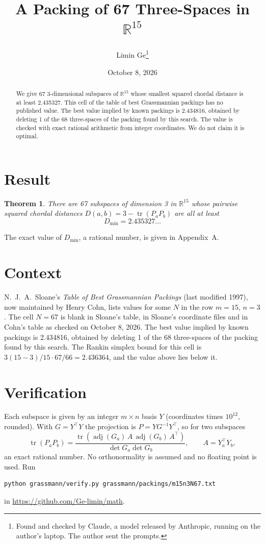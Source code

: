 \documentclass[11pt,a4paper]{article}
\title{A Packing of 67 Three-Spaces in $\mathbb{R}^{15}$}
\author{Limin Ge\thanks{Found and checked by Claude, a model released by Anthropic, running on the author's laptop. The author sent the prompts.}}
\date{October 8, 2026}
\newtheorem*{theorem}{Theorem}
\begin{document}
\maketitle
\begin{abstract}
We give 67 3-dimensional subspaces of $\mathbb{R}^{15}$ whose smallest squared chordal distance is at least 2.435327. This cell of the table of best Grassmannian packings has no published value. The best value implied by known packings is 2.434816, obtained by deleting 1 of the 68 three-spaces of the packing found by this search. The value is checked with exact rational arithmetic from integer coordinates. We do not claim it is optimal.
\end{abstract}

\section{Result}
\begin{theorem}
There are 67 subspaces of dimension 3 in $\mathbb{R}^{15}$ whose pairwise squared chordal distances $D(a,b) = 3 - \operatorname{tr}(P_aP_b)$ are all at least
\[ D_{\min} = 2.435327\ldots \]
\end{theorem}
The exact value of $D_{\min}$, a rational number, is given in Appendix~A.


\section{Context}
N.~J.~A.~Sloane's \emph{Table of Best Grassmannian Packings} (last modified 1997), now maintained by Henry Cohn, lists values for some $N$ in the row $m=15$, $n=3$. The cell $N=67$ is blank in Sloane's table, in Sloane's coordinate files and in Cohn's table as checked on October 8, 2026. The best value implied by known packings is 2.434816, obtained by deleting 1 of the 68 three-spaces of the packing found by this search. The Rankin simplex bound for this cell is $3(15-3)/15\cdot 67/66 = 2.436364$, and the value above lies below it.


\section{Verification}
Each subspace is given by an integer $m\times n$ basis $Y$ (coordinates times $10^{12}$, rounded). With $G=Y^\top Y$ the projection is $P=YG^{-1}Y^\top$, so for two subspaces
\[ \operatorname{tr}(P_aP_b)=\frac{\operatorname{tr}(\operatorname{adj}(G_a)\,A\,\operatorname{adj}(G_b)\,A^\top)}{\det G_a\det G_b},\qquad A=Y_a^\top Y_b, \]
an exact rational number. No orthonormality is assumed and no floating point is used. Run
\begin{verbatim}
python grassmann/verify.py grassmann/packings/m15n3N67.txt
\end{verbatim}
in \url{https://github.com/Ge-limin/math}.
\end{document}
